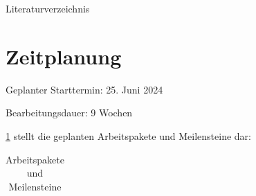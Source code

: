 \documentclass[11pt]{scrartcl}
\begin{document}
	{\parindent=5mm
		Literaturverzeichnis}%

	\pagebreak
	\section{Zeitplanung}
	
	Geplanter Starttermin: 
	25. Juni 2024
	
	\noindent
	Bearbeitungsdauer: 9 Wochen
	
	\noindent
	\cref{tab:zeitplanung} stellt die geplanten Arbeitspakete und Meilensteine dar:
	\begin{table}[H]		%
		
		\caption{Arbeitspakete und Meilensteine} \label{tab:zeitplanung} 
		
		\centering
		\def\arraystretch{1.3}%
		\begin{tabular}{|c|p{10cm}|c|}
			

\end{tabular}
\end{table}
\end{document}

